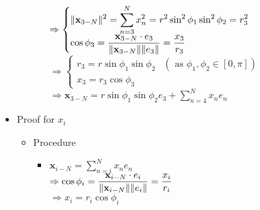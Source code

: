 \begin{itemize}
\begin{itemize}
\begin{itemize}
		$\displaystyle \Rightarrow \begin{cases} \displaystyle \lVert\mathbf x_{3-N}\rVert^2 = \sum_{n=3}^Nx_n^2 = r^2\sin^2\phi_1\sin^2\phi_2 = r_3^2 \\ \displaystyle \cos\phi_3 = \frac {\mathbf x_{3-N}\cdot e_3} {\lVert\mathbf x_{3-N}\rVert \lVert e_3\rVert} = \frac{x_3}{r_3} \end{cases}$ \\
		$\displaystyle \Rightarrow \begin{cases} r_3 = r \sin \phi_1 \sin \phi_2 & (\text{ as } \phi_1,\phi_2\in[0,\pi]) \\ x_3 = r_3\cos\phi_3 \end{cases}$ \\
		$\displaystyle \Rightarrow \mathbf x_{3-N} = r\sin\phi_1\sin\phi_2e_3 + \sum_{n=4}^Nx_ne_n$
		\end{itemize}
	\end{itemize}

\item Proof for $x_i$
	\begin{itemize}
	\item Procedure
		\begin{itemize}
		\item $\displaystyle \mathbf x_{i-N} = \sum_{n=i}^{N} x_ne_n$ \\
		$\displaystyle \Rightarrow \cos\phi_i = \frac {\mathbf x_{i-N}\cdot e_i}{\lVert\mathbf x_{i-N}\rVert\lVert e_i\rVert} = \frac {x_i}{r_i}$ \\
		$\Rightarrow x_i = r_i\cos\phi_i$
		\end{itemize}
	\end{itemize}


\end{itemize}
